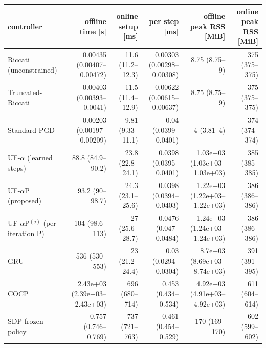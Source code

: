 \begin{tabular}{lrrrrr}
\toprule
controller & offline time [s] & online setup [ms] & per step [ms] & offline peak RSS [MiB] & online peak RSS [MiB] \\
\midrule
Riccati (unconstrained) & 0.00435 (0.00407--0.00472) & 11.6 (11.2--12.3) & 0.00303 (0.00298--0.00308) & 8.75 (8.75--9) & 375 (375--375) \\
Truncated-Riccati & 0.00403 (0.00393--0.0041) & 11.5 (11.4--12.9) & 0.00622 (0.00615--0.00637) & 8.75 (8.75--9) & 375 (375--375) \\
Standard-PGD & 0.00203 (0.00197--0.00209) & 9.81 (9.33--11.1) & 0.04 (0.0399--0.0401) & 4 (3.81--4) & 374 (374--374) \\
UF-$\alpha$ (learned steps) & 88.8 (84.9--90.2) & 23.8 (22.8--24.1) & 0.0398 (0.0395--0.0401) & 1.03e+03 (1.03e+03--1.03e+03) & 385 (385--385) \\
UF-$\alpha$P (proposed) & 93.2 (90--98.7) & 24.3 (23.1--25.6) & 0.0398 (0.0394--0.0403) & 1.22e+03 (1.22e+03--1.22e+03) & 386 (386--386) \\
UF-$\alpha$P$^{(j)}$ (per-iteration P) & 104 (98.6--113) & 27 (25.6--28.7) & 0.0476 (0.047--0.0484) & 1.24e+03 (1.24e+03--1.24e+03) & 386 (386--386) \\
GRU & 536 (530--553) & 23 (21.2--24.4) & 0.03 (0.0294--0.0304) & 8.7e+03 (8.69e+03--8.74e+03) & 391 (391--395) \\
COCP & 2.43e+03 (2.39e+03--2.43e+03) & 696 (680--714) & 0.453 (0.434--0.534) & 4.92e+03 (4.91e+03--4.92e+03) & 611 (604--614) \\
SDP-frozen policy & 0.757 (0.746--0.769) & 737 (721--763) & 0.461 (0.454--0.529) & 170 (169--170) & 602 (599--602) \\
\bottomrule
\end{tabular}
